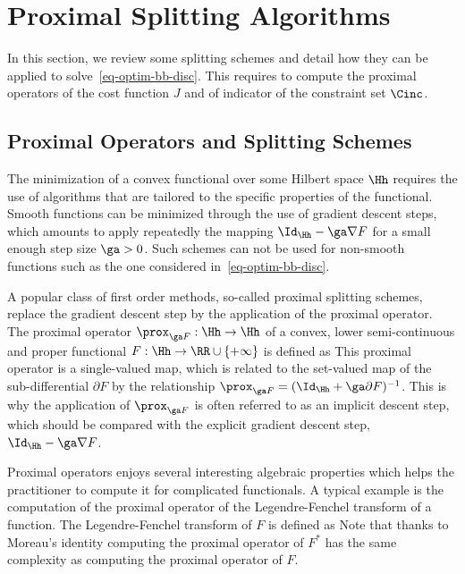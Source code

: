 
\section{Proximal Splitting Algorithms}
\label{sec-proximal}

In this section, we review some splitting schemes and detail how they can be applied to solve~\eqref{eq-optim-bb-disc}. This requires to compute the proximal operators of the cost function $J$ and of indicator of the constraint set $\Cinc$. 

\subsection{Proximal Operators and Splitting Schemes}

The minimization of a convex functional over some Hilbert space $\Hh$ requires the use of algorithms that are tailored to the specific properties of the functional. Smooth functions can be minimized through the use of gradient descent steps, which amounts to apply repeatedly the mapping $\Id_{\Hh} - \ga \nabla F$ for a small enough step size $\ga>0$. Such schemes can not be used for non-smooth functions such as the one considered in~\eqref{eq-optim-bb-disc}. 

A popular class of first order methods, so-called proximal splitting schemes, replace the gradient descent step by the application of the proximal operator. The proximal operator $\prox_{\ga F} : \Hh \rightarrow \Hh$ of a convex, lower semi-continuous and proper functional $F : \Hh \rightarrow \RR \cup \{+\infty\}$ is defined as
This proximal operator is a single-valued map, which is related to the set-valued map of the sub-differential $\partial F$ by the relationship $\prox_{\ga F} = ( \Id_{\Hh} + \ga \partial F )^{-1}$. This is why the application of $\prox_{\ga F}$ is often referred to as an implicit descent step, which should be compared with the explicit gradient descent step, $\Id_{\Hh} - \ga \nabla F$. 

Proximal operators enjoys several interesting algebraic properties which helps the practitioner to compute it for complicated functionals. A typical example is the computation of the proximal operator of the Legendre-Fenchel transform of a function. The Legendre-Fenchel transform of $F$ is defined as
Note that thanks to Moreau's identity
computing the proximal operator of $F^*$ has the same complexity as computing the proximal operator of $F$. 

